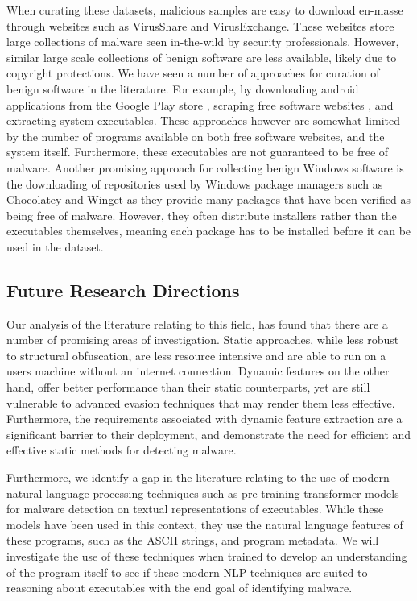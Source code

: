 \documentclass[conference,compsoc]{IEEEtran}
\begin{document}
When curating these datasets, malicious samples are easy to download en-masse through websites such as VirusShare and VirusExchange. These websites store large collections of malware seen in-the-wild by security professionals. However, similar large scale collections of benign software are less available, likely due to copyright protections. We have seen a number of approaches for curation of benign software in the literature. For example, by downloading android applications from the Google Play store \cite{karbabMalDozerAutomaticFramework2018}, scraping free software websites \cite{liDMalNetDynamicMalware2022}, and extracting system executables. These approaches however are somewhat limited by the number of programs available on both free software websites, and the system itself. Furthermore, these executables are not guaranteed to be free of malware. Another promising approach for collecting benign Windows software is the downloading of repositories used by Windows package managers such as Chocolatey and Winget as they provide many packages that have been verified as being free of malware. However, they often distribute installers rather than the executables themselves, meaning each package has to be installed before it can be used in the dataset. 

\subsection{Future Research Directions}

Our analysis of the literature relating to this field, has found that there are a number of promising areas of investigation. Static approaches, while less robust to structural obfuscation, are less resource intensive and are able to run on a users machine without an internet connection. Dynamic features on the other hand, offer better performance than their static counterparts, yet are still vulnerable to advanced evasion techniques that may render them less effective. Furthermore, the requirements associated with dynamic feature extraction are a significant barrier to their deployment, and demonstrate the need for efficient and effective static methods for detecting malware. 

Furthermore, we identify a gap in the literature relating to the use of modern natural language processing techniques such as pre-training transformer models for malware detection on textual representations of executables. While these models have been used in this context, they use the natural language features of these programs, such as the ASCII strings, and program metadata. We will investigate the use of these techniques when trained to develop an understanding of the program itself to see if these modern NLP techniques are suited to reasoning about executables with the end goal of identifying malware.
\end{document}
